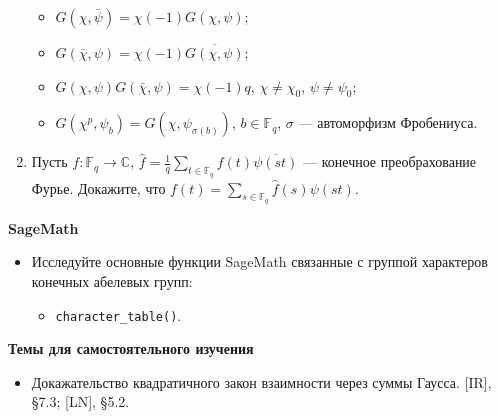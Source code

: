 \begin{enumerate}[topsep=0pt]
\begin{itemize}[topsep=0pt]
        \item $G(\chi,\bar{\psi}) = \chi(-1) G(\chi,\psi)$;
        \item $G(\bar{\chi},\psi) = \chi(-1) \overline{G(\chi,\psi)}$;
        \item $G(\chi,\psi)G(\bar{\chi},\psi)=\chi(-1) q$, $\chi\neq\chi_0$, $\psi\neq\psi_0$;
        \item $G(\chi^p,\psi_b)=G(\chi,\psi_{\sigma(b)})$, $b\in\mathbb{F}_q$, $\sigma$ --- автоморфизм Фробениуса.
    \end{itemize} %
    \item Пусть $f:\mathbb{F}_q \rightarrow \mathbb{C}$, $\hat{f} = \frac{1}{q}\sum_{t\in\mathbb{F}_q} f(t)\overline{\psi(st)}$ --- конечное преобрахование Фурье. Докажите, что $f(t)=\sum_{s\in\mathbb{F}_q} \hat{f}(s) \psi(st)$. %
\end{enumerate}

\noindent\textbf{SageMath}
\begin{itemize}[topsep=0pt]
    \item Исследуйте основные функции SageMath связанные с группой характеров конечных абелевых групп:
    \begin{itemize}[noitemsep,topsep=0pt]
        \item \texttt{character\_table()}.
     \end{itemize}
\end{itemize}

\noindent\textbf{Темы для самостоятельного изучения}
\begin{itemize}[topsep=0pt]
    \item Докажательство квадратичного закон взаимности через суммы Гаусса. [IR], \S 7.3; [LN], \S 5.2.
\end{itemize}

